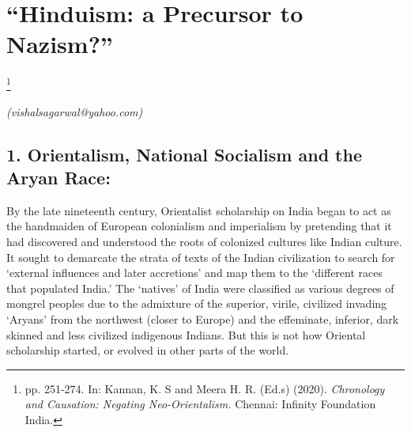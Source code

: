 
\chapter{“Hinduism: a Precursor to Nazism?”}\label{chapter8}

\footnote{pp. 251-274. In: Kannan, K. S and Meera H. R. (Ed.s) (2020). \textit{Chronology and Causation: Negating Neo-Orientalism.} Chennai: Infinity Foundation India.}

\begin{flushright}
\textit{(vishalsagarwal@yahoo.com)}
\end{flushright}

\setcounter{endnote}{0}

\section*{1. Orientalism, National Socialism and the Aryan Race:}

By the late nineteenth century, Orientalist scholarship on India began to act as the handmaiden of European colonialism and imperialism by pretending that it had discovered and understood the roots of colonized cultures like Indian culture. It sought to demarcate the strata of texts of the Indian civilization to search for ‘external influences and later accretions’ and map them to the ‘different races that populated India.’ The ‘natives’ of India were classified as various degrees of mongrel peoples due to the admixture of the superior, virile, civilized invading ‘Aryans’ from the northwest (closer to Europe) and the effeminate, inferior, dark skinned and less civilized indigenous Indians. But this is not how Oriental scholarship started, or evolved in other parts of the world.

